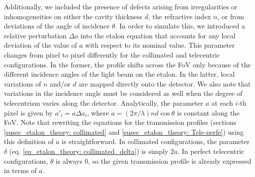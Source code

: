 Additionally, we included the presence of defects arising from irregularities or inhomogeneities on either the cavity thickness $d$, the refractive index $n$, or from deviations of the angle of incidence $\theta$. In order to simulate this, we introduced a relative perturbation $\Delta a$ into the etalon equation that accounts for any local deviation of the value of $a$ with respect to its nominal value. This parameter changes from pixel to pixel differently for the collimated and telecentric configurations. In the former, the profile shifts across the FoV only because of the different incidence angles of the light beam on the etalon. In the latter, local variations of $n$ and/or $d$ are mapped directly onto the detector. We also note that variations in the incidence angle must be considered as well when the degree of telecentrism varies along the detector. Analytically, the parameter $a$ at each $i$-th pixel is given by $a' _ i = a \Delta a _ i$, where $a = (2\pi/\lambda) n d\cos\theta$ is constant along the FoV. Note that rewriting the equations for the transmission profiles (sections \ref{susec_etalon_theory: collimated} and \ref{susec_etalon_theory: Tele-perfe}) using this definition of $a$ is straightforward. In collimated configurations, the parameter $\delta$ (eq. \eqref{eq_etalon_theory: collimated_delta}) is simply $2a$. In perfect telecentric configurations, $\theta$ is always 0, so the given transmission profile is already expressed in terms of $a$.   

